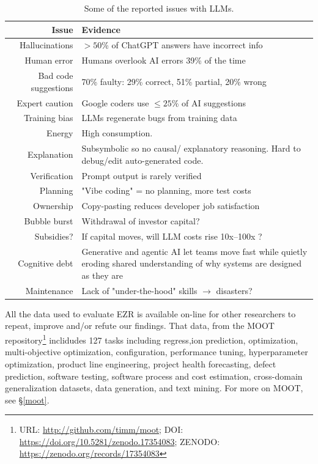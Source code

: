 \documentclass[AMA,STIX2COL]{WileyNJDv5}
\begin{document}
\begin{table}[!t]
\fontsize{8pt}{9.5pt}\selectfont
\captionsetup[table]{font=small}
\caption{Some of the reported issues with LLMs.}\label{cautions}
\begin{tabularx}{\columnwidth}{r|X}
 \textbf{Issue} & \textbf{Evidence} \\ \hline
 Hallucinations & $>50$\% of ChatGPT answers have incorrect
 info \cite{S12} \\
 Human error & Humans overlook AI errors 39\% of the time
 \cite{S12} \\
 Bad code suggestions & 70\% faulty: 29\% correct, 51\% partial, 20\%
 wrong \cite{S15} \\
 Expert caution & Google coders use $\le 25\%$ of AI
 suggestions \cite{tabachnyk22completion} \\
 Training bias & LLMs regenerate bugs from training data
 \cite{S13} \\
 Energy & High consumption.   \\
 Explanation & Subsymbolic so  no causal/ explanatory reasoning.   
 Hard to debug/edit auto-generated code.   \\
 Verification & Prompt output is rarely verified  \\
 Planning & "Vibe coding" = no planning, more test
 costs  \\
 Ownership & Copy-pasting reduces developer job satisfaction  \\
 Bubble burst &  Withdrawal of investor capital?  \\
 Subsidies? & If capital moves, will LLM costs rise 10x--100x ? \\
 Cognitive debt & Generative and agentic AI let teams move fast
 while quietly eroding shared understanding of why systems are
 designed as they are \cite{CognitiveDebt}\\
 Maintenance & Lack of "under-the-hood" skills $\rightarrow$   
 disasters? \\ \hline
\end{tabularx}
\end{table}

All the data used to evaluate EZR is available on-line for other researchers
to repeat, improve and/or refute our findings.
That data, from the  MOOT
repository\footnote{URL: \url{http://github.com/timm/moot}; 
DOI: \url{https://doi.org/10.5281/zenodo.17354083}; 
ZENODO: \url{https://zenodo.org/records/17354083}} inclidudes 127 tasks 
including regress,ion prediction, optimization, multi-objective optimization, configuration, performance tuning, hyperparameter optimization, product line engineering, project
health forecasting, defect prediction, software testing, software process and cost estimation, cross-domain generalization datasets, data generation, and text mining.  For more on MOOT, see \S\ref{moot}.
\end{document}
